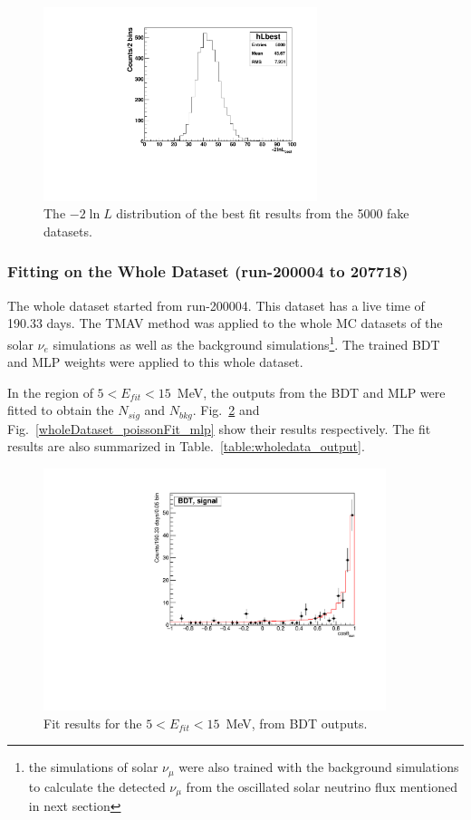\begin{figure}[!htb]
	\centering
	\includegraphics[width=8cm]{ensemble_lnLbest.pdf}
	\caption{The $-2\ln L$ distribution of the best fit results from the 5000 fake datasets.}
	\label{poisson_fitLnL}
\end{figure}

\subsubsection{Fitting on the Whole Dataset (run-200004 to 207718)}\label{sect:fitTheWhole}
The whole dataset started from run-200004. This dataset has a live time of 190.33 days. The TMAV method was applied to the whole MC datasets of the solar $\nu_e$ simulations as well as the background simulations\footnote{the simulations of solar $\nu_{\mu}$ were also trained with the background simulations to calculate the detected $\nu_\mu$ from the oscillated solar neutrino flux mentioned in next section}. The trained BDT and MLP weights were applied to this whole dataset.

In the region of $5<E_{fit}<15$~MeV, the outputs from the BDT and MLP were fitted to obtain the $N_{sig}$ and $N_{bkg}$. Fig.~\ref{wholeDataset_poissonFit_bdt} and Fig.~\ref{wholeDataset_poissonFit_mlp} show their results respectively. The fit results are also summarized in Table.~\ref{table:wholedata_output}.

\begin{figure}[!htb]
	\centering
	\includegraphics[width=10cm]{wholedataFit_bdt.pdf}
	\caption{Fit results for the $5<E_{fit}<15$~MeV, from BDT outputs.} \label{wholeDataset_poissonFit_bdt}
\end{figure} 

